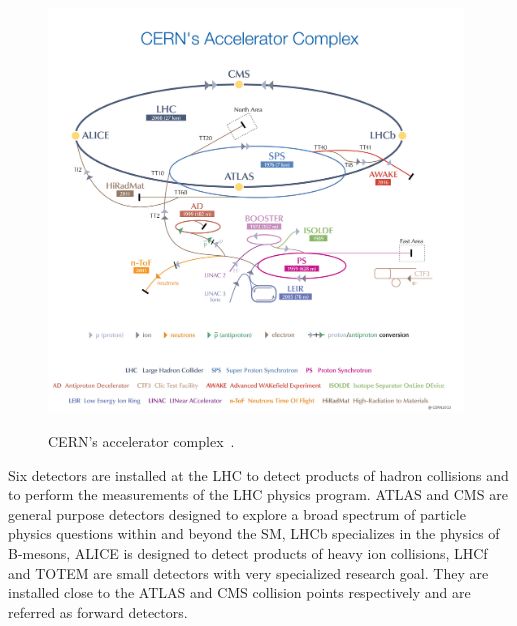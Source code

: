 \begin{figure}[htb]
  \begin{center}
    {\includegraphics[width=0.98\textwidth]{../figs/Exp/CERN_accelerator_complex2013.jpg}}
    \caption{CERN's accelerator complex~\cite{ref_fig_CERNacceleratorComplex}.}
    \label{fig:CERN_accelerator_complex}
  \end{center}
\end{figure}




Six detectors are installed at the LHC to detect products of hadron collisions and to perform the measurements of the LHC physics program. ATLAS and CMS are general purpose detectors designed to explore a broad spectrum of particle physics questions within and beyond the SM, LHCb specializes in the physics of B-mesons, ALICE is designed to detect products of heavy ion collisions, LHCf and TOTEM are small detectors with very specialized research goal. They are installed close to the ATLAS and CMS collision points respectively and are referred as forward detectors. 

